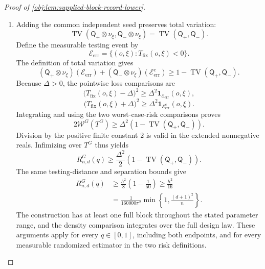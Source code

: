 \begin{proof}[Proof of \cref{obj:lem:supplied-block-record-lower}]
\begin{enumerate}
\item Adding the common independent seed preserves total variation:
\[
\operatorname{TV}
(\mathsf Q_+\otimes\nu_\xi,\mathsf Q_-\otimes\nu_\xi)
=
\operatorname{TV}(\mathsf Q_+,\mathsf Q_-).
\]
Define the measurable testing event by
\[
\mathcal E_{\mathrm{err}}
=
\{(o,\xi):T_{\mathrm{fix}}(o,\xi)<0\}.
\]
The definition of total variation gives
\[
(\mathsf Q_+\otimes\nu_\xi)(\mathcal E_{\mathrm{err}})
+
(\mathsf Q_-\otimes\nu_\xi)(\mathcal E_{\mathrm{err}}^c)
\ge
1-\operatorname{TV}(\mathsf Q_+,\mathsf Q_-).
\]
Because \(\Delta>0\), the pointwise loss comparisons are
\[
\bigl(T_{\mathrm{fix}}(o,\xi)-\Delta\bigr)^2
\ge\Delta^2\mathbf1_{\mathcal E_{\mathrm{err}}}(o,\xi),
\]
\[
\bigl(T_{\mathrm{fix}}(o,\xi)+\Delta\bigr)^2
\ge\Delta^2\mathbf1_{\mathcal E_{\mathrm{err}}^c}(o,\xi).
\]
Integrating and using the two worst-case-risk comparisons proves
\[
2\mathcal W^G(T^G)
\ge
\Delta^2\left(1-\operatorname{TV}(\mathsf Q_+,\mathsf Q_-)\right).
\]
Division by the positive finite constant \(2\) is valid in the extended nonnegative reals. Infimizing over \(T^G\) thus yields
\[
R^G_{n,d}(q)
\ge
\frac{\Delta^2}{2}
\left(1-\operatorname{TV}(\mathsf Q_+,\mathsf Q_-)\right).
\]
The same testing-distance and separation bounds give
\[
\begin{aligned}
R^G_{n,d}(q)
&\ge
\frac{h^2}{8}\left(1-\frac1{50}\right)
\ge\frac{h^2}{16}\\
&=
\frac{1}{160000\pi^2}
\min\left\{1,\frac{(d+1)^2}{n}\right\}.
\end{aligned}
\]
The construction has at least one full block throughout the stated parameter range, and the density comparison integrates over the full design law. These arguments apply for every \(q\in[0,1]\), including both endpoints, and for every measurable randomized estimator in the two risk definitions.
\end{enumerate}
\end{proof}
